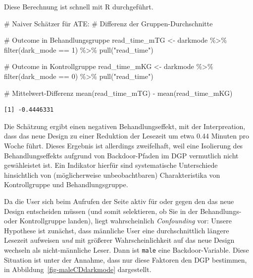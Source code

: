 \documentclass[
  a4paper,
  DIV=11,
  oneside]{scrreprt}
\newenvironment{Shaded}{\begin{snugshade}}{\end{snugshade}}
\newcommand{\CommentTok}[1]{\textcolor[rgb]{0.37,0.37,0.37}{#1}}
\newcommand{\DecValTok}[1]{\textcolor[rgb]{0.68,0.00,0.00}{#1}}
\newcommand{\FunctionTok}[1]{\textcolor[rgb]{0.28,0.35,0.67}{#1}}
\newcommand{\NormalTok}[1]{\textcolor[rgb]{0.00,0.23,0.31}{#1}}
\newcommand{\OtherTok}[1]{\textcolor[rgb]{0.00,0.23,0.31}{#1}}
\newcommand{\SpecialCharTok}[1]{\textcolor[rgb]{0.37,0.37,0.37}{#1}}
\newcommand{\StringTok}[1]{\textcolor[rgb]{0.13,0.47,0.30}{#1}}
\begin{document}
Diese Berechnung ist schnell mit R durchgeführt.

\begin{Shaded}
\begin{Highlighting}[]
\CommentTok{\# Naiver Schätzer für ATE: }
\CommentTok{\# Differenz der Gruppen{-}Durchschnitte}

\CommentTok{\# Outcome in Behandlungsgruppe}
\NormalTok{read\_time\_mTG }\OtherTok{\textless{}{-}}\NormalTok{ darkmode }\SpecialCharTok{\%\textgreater{}\%} 
  \FunctionTok{filter}\NormalTok{(dark\_mode }\SpecialCharTok{==} \DecValTok{1}\NormalTok{) }\SpecialCharTok{\%\textgreater{}\%} 
  \FunctionTok{pull}\NormalTok{(}\StringTok{"read\_time"}\NormalTok{)}

\CommentTok{\# Outcome in Kontrollgruppe}
\NormalTok{read\_time\_mKG }\OtherTok{\textless{}{-}}\NormalTok{ darkmode }\SpecialCharTok{\%\textgreater{}\%} 
  \FunctionTok{filter}\NormalTok{(dark\_mode }\SpecialCharTok{==} \DecValTok{0}\NormalTok{) }\SpecialCharTok{\%\textgreater{}\%} 
  \FunctionTok{pull}\NormalTok{(}\StringTok{"read\_time"}\NormalTok{)}

\CommentTok{\# Mittelwert{-}Differenz}
\FunctionTok{mean}\NormalTok{(read\_time\_mTG) }\SpecialCharTok{{-}} \FunctionTok{mean}\NormalTok{(read\_time\_mKG)}
\end{Highlighting}
\end{Shaded}

\begin{verbatim}
[1] -0.4446331
\end{verbatim}

Die Schätzung ergibt einen negativen Behandlungseffekt, mit der
Interpreation, dass das neue Design zu einer Reduktion der Lesezeit um
etwa 0.44 Minuten pro Woche führt. Dieses Ergebnis ist allerdings
zweifelhaft, weil eine Isolierung des Behandlungseffekts aufgrund von
Backdoor-Pfaden im DGP vermutlich nicht gewähleistet ist. Ein Indikator
hierfür sind systematische Unterschiede hinsichtlich von (möglicherweise
unbeobachtbaren) Charakteristika von Kontrollgruppe und
Behandlungsgruppe.

Da die User sich beim Aufrufen der Seite aktiv für oder gegen den das
neue Design entscheiden müssen (und somit selektieren, ob Sie in der
Behandlungs- oder Kontrollgruppe landen), liegt wahrscheinlich
\emph{Confounding} vor: Unsere Hypothese ist zunächst, dass männliche
User eine durchschnittlich längere Lesezeit aufweisen \emph{und} mit
größerer Wahrscheinlichkeit auf das neue Design wechseln als
nicht-männliche Leser. Dann ist \texttt{male} eine Backdoor-Variable.
Diese Situation ist unter der Annahme, dass nur diese Faktoren den DGP
bestimmen, in Abbildung~\ref{fig-maleCDdarkmode} dargestellt.
\end{document}
